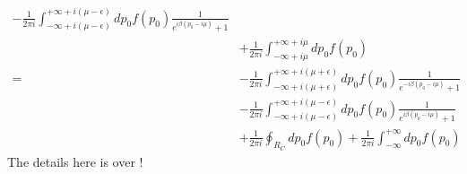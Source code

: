 \documentclass{article}
\begin{document}
\begin{equation}
\begin{split}
        -\frac{1}{2\pi i}\int_{-\infty+i\left(\mu-\epsilon\right)}^{+\infty+i\left(\mu-\epsilon\right)}dp_0 f\left(p_0\right)\frac{1}{e^{i\beta\left(p_0-i\mu\right)}+1}\\
        &+\frac{1}{2\pi i}\int_{-\infty+i\mu}^{+\infty+i\mu}dp_0 f\left(p_0\right)\\
        =&-\frac{1}{2\pi i}\int_{-\infty+i\left(\mu+\epsilon\right)}^{+\infty+i\left(\mu+\epsilon\right)}dp_0 f\left(p_0\right)\frac{1}{e^{-i\beta\left(p_0-i\mu\right)}+1}\\
        &-\frac{1}{2\pi i}\int_{-\infty+i\left(\mu-\epsilon\right)}^{+\infty+i\left(\mu-\epsilon\right)}dp_0 f\left(p_0\right)\frac{1}{e^{i\beta\left(p_0-i\mu\right)}+1}\\
        &+\frac{1}{2\pi i}\oint_{ R_C} dp_0 f\left(p_0\right)
        +\frac{1}{2\pi i}\int_{-\infty}^{+\infty}  dp_0 f\left(p_0\right)
    \end{split}
\end{equation}
The details here is over !
\end{document}

